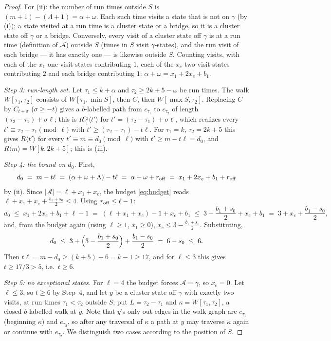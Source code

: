 \documentclass[11pt]{article}
\theoremstyle{definition}
\begin{document}
\begin{proof}
For (ii): the number of run times outside $S$ is $(m+1)-(\Lambda+1)=
\alpha+\omega$. Each such time visits a state that is not on $\gamma$ (by
(i)); a state visited at a run time is a cluster state or a bridge, so it is
a cluster state off $\gamma$ or a bridge. Conversely, every visit of a
cluster state off $\gamma$ is at a run time (definition of $\mathcal A$)
outside $S$ (times in $S$ visit $\gamma$-states), and the run visit of each
bridge --- it has exactly one --- is likewise outside $S$. Counting visits,
with each of the $x_1$ one-visit states contributing $1$, each of the $x_e$
two-visit states contributing $2$ and each bridge contributing $1$:
$\alpha+\omega=x_1+2x_e+b_1$.

\emph{Step 3: run-length set.} Let $\tau_1\le k+\alpha$ and
$\tau_2\ge2k+5-\omega$ be run times. The walk $W[\tau_1,\tau_2]$ consists of
$W[\tau_1,\min S]$, then $C$, then $W[\max S,\tau_2]$. Replacing $C$ by
$C_{t+\sigma}$ ($\sigma\ge-t$) gives a $b$-labelled path from $c_{\tau_1}$
to $c_{\tau_2}$ of length $(\tau_2-\tau_1)+\sigma\ell$; this is
$R_{\tau_1}^{\tau_2}\langle t'\rangle$ for
$t'=(\tau_2-\tau_1)+\sigma\ell$, which realizes every
$t'\equiv\tau_2-\tau_1\pmod\ell$ with $t'\ge(\tau_2-\tau_1)-t\ell$. For
$\tau_1=k$, $\tau_2=2k+5$ this gives $R\langle t'\rangle$ for every
$t'\equiv m\equiv d_0\pmod\ell$ with $t'\ge m-t\ell=d_0$, and
$R\langle m\rangle=W[k,2k+5]$; this is (iii).

\emph{Step 4: the bound on $d_0$.} First,
\[
d_0\;=\;m-t\ell\;=\;(\alpha+\omega+\Lambda)-t\ell\;=\;\alpha+\omega+r_{\rm off}
\;=\;x_1+2x_e+b_1+r_{\rm off}
\]
by (ii). Since $|\mathcal A|=\ell+x_1+x_e$, the budget \eqref{eq:budget}
reads $\ell+x_1+x_e+\frac{b_1+s_0}2\le4$. Using $r_{\rm off}\le\ell-1$:
\[
d_0\;\le\;x_1+2x_e+b_1+\ell-1
\;=\;(\ell+x_1+x_e)-1+x_e+b_1
\;\le\;3-\frac{b_1+s_0}{2}+x_e+b_1
\;=\;3+x_e+\frac{b_1-s_0}{2},
\]
and, from the budget again (using $\ell\ge1$, $x_1\ge0$),
$x_e\le 3-\frac{b_1+s_0}2$. Substituting,
\[
d_0\;\le\;3+\Bigl(3-\frac{b_1+s_0}2\Bigr)+\frac{b_1-s_0}{2}\;=\;6-s_0\;\le\;6 .
\]
Then $t\ell=m-d_0\ge(k+5)-6=k-1\ge17$, and for $\ell\le3$ this gives
$t\ge17/3>5$, i.e.\ $t\ge6$.

\emph{Step 5: no exceptional states.} For $\ell=4$ the budget forces
$\mathcal A=\gamma$, so $x_e=0$. Let $\ell\le3$, so $t\ge6$ by Step~4, and
let $y$ be a cluster state off $\gamma$ with exactly two visits, at run
times $\tau_1<\tau_2$ outside $S$; put $L=\tau_2-\tau_1$ and
$\kappa=W[\tau_1,\tau_2]$, a closed $b$-labelled walk at $y$. Note that
$y$'s only out-edges in the walk graph are $e_{\tau_1}$ (beginning
$\kappa$) and $e_{\tau_2}$, so after any traversal of $\kappa$ a path at $y$
may traverse $\kappa$ again or continue with $e_{\tau_2}$. We distinguish
two cases according to the position of $S$.


\end{proof}
\end{document}
